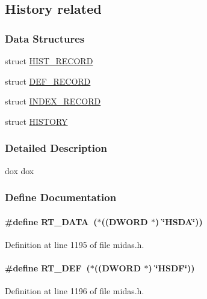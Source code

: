 \subsection{History related}
\label{group__mhistoryh}
\subsubsection*{Data Structures}
\begin{DoxyCompactItemize}
\item 
struct \hyperlink{structHIST__RECORD}{HIST\_\-RECORD}
\item 
struct \hyperlink{structDEF__RECORD}{DEF\_\-RECORD}
\item 
struct \hyperlink{structINDEX__RECORD}{INDEX\_\-RECORD}
\item 
struct \hyperlink{structHISTORY}{HISTORY}
\end{DoxyCompactItemize}


\subsubsection{Detailed Description}
dox dox 

\subsubsection{Define Documentation}
\paragraph[{RT\_\-DATA}]{\setlength{\rightskip}{0pt plus 5cm}\#define RT\_\-DATA~($\ast$(({\bf DWORD} $\ast$) \char`\"{}HSDA\char`\"{}))}\hfill\label{group__mhistoryh_gaa8c3f42edf394b6d0fd9f1c3e00fe948}


Definition at line 1195 of file midas.h.
\paragraph[{RT\_\-DEF}]{\setlength{\rightskip}{0pt plus 5cm}\#define RT\_\-DEF~($\ast$(({\bf DWORD} $\ast$) \char`\"{}HSDF\char`\"{}))}\hfill\label{group__mhistoryh_ga53bf0d0c21b64cf42e4355c3919f6fa2}


Definition at line 1196 of file midas.h.